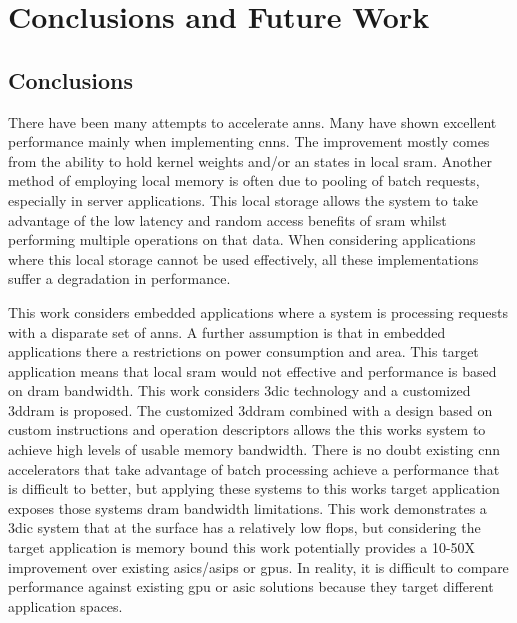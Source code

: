 
\chapter{Conclusions and Future Work}
\label{sec:Conclusions and Future Work}
\label{sec:chap-seven}

\section[Conclusions]{Conclusions}
\label{sec:Conclusions}

There have been many attempts to accelerate \acp{ann}. Many have shown excellent performance mainly when implementing \acp{cnn}. The improvement mostly comes from the ability to hold kernel weights and/or \ac{an} states in local \ac{sram}. 
Another method of employing local memory is often due to pooling of batch requests, especially in server applications.
This local storage allows the system to take advantage of the low latency and random access benefits of \ac{sram} whilst performing multiple operations on that data.
When considering applications where this local storage cannot be used effectively, all these implementations suffer a degradation in performance.

This work considers embedded applications where a system is processing requests with a disparate set of \acp{ann}. 
A further assumption is that in embedded applications there a restrictions on power consumption and area.
This target application means that local \ac{sram} would not effective and performance is based on \ac{dram} bandwidth.
This work considers \acf{3dic} technology and a customized \acf{3ddram} is proposed. 
The customized \ac{3ddram} combined with a design based on custom instructions and operation descriptors allows the this works system to achieve high levels of usable memory bandwidth.
There is no doubt existing \ac{cnn} accelerators that take advantage of batch processing achieve a performance that is difficult to better, but applying these systems to this works target application exposes those systems \ac{dram} bandwidth limitations.
This work demonstrates a \ac{3dic} system that at the surface has a relatively low \ac{flops}, but considering the target application is memory bound this work potentially provides a 10-50X improvement over existing \acp{asic}/\acp{asip} or \acp{gpu}.
In reality, it is difficult to compare performance against existing \ac{gpu} or \ac{asic} solutions because they target different application spaces. 
\iffalse
given the target application, provides a potentially 10-50X performance improvement over existing ASIC/ASIPs or GPUs.
\fi

